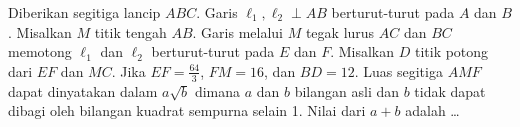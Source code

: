 Diberikan segitiga lancip $ABC$. Garis $\ell_1, \ell_2 \perp AB$ berturut-turut pada $A$ dan $B$. Misalkan $M$ titik tengah $AB$. Garis melalui $M$ tegak lurus $AC$ dan $BC$ memotong $\ell_1$ dan $\ell_2$ berturut-turut pada $E$ dan $F$. Misalkan $D$ titik potong dari $EF$ dan $MC$. Jika $EF = \frac{64}{3}$, $FM = 16$, dan $BD = 12$. Luas segitiga $AMF$ dapat dinyatakan dalam $a\sqrt{b}$ dimana $a$ dan $b$ bilangan asli dan $b$ tidak dapat dibagi oleh bilangan kuadrat sempurna selain 1. Nilai dari $a + b$ adalah \dots